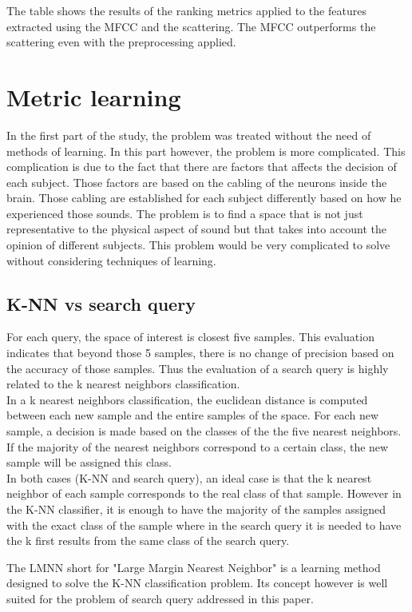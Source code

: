 \documentclass[hidelinks,12pt]{report}
\begin{document}
The table shows the results of the ranking metrics applied to the features extracted using the MFCC and the scattering. The MFCC outperforms the scattering even with the preprocessing applied.

\section{Metric learning}
In the first part of the study, the problem was treated without the need of methods of learning. In this part however, the problem is more complicated. This complication is due to the fact that there are factors that affects the decision of each subject.  Those factors are based on the cabling of the neurons inside the brain. Those cabling are established for each subject differently  based on how he experienced those sounds. The problem is to find a space that is not just representative to the physical aspect of sound but that takes into account the opinion of different subjects. This problem would be very complicated to solve without considering techniques of learning. 
\subsection{K-NN vs search query}
For each query, the space of interest is closest five samples. This evaluation indicates that beyond those 5 samples, there is no change of precision based on the accuracy of those samples. Thus the evaluation of a search query is highly related to the k nearest neighbors classification.\\
In a k nearest neighbors classification, the euclidean distance is computed between each new sample and the entire samples of the space. For each new sample, a decision is made based on the classes of the the five nearest neighbors. If the majority of the nearest neighbors correspond to a certain class, the new sample will be assigned this class.\\
In both cases (K-NN and search query), an ideal case is that the k nearest neighbor of each sample corresponds to the real class of that sample. However in the K-NN classifier, it is enough to have the majority of the samples assigned with the exact class of the sample where in the search query it is needed to have the k first results from the same class of the search query.\par
The LMNN short for "Large Margin Nearest Neighbor" is a learning method designed to solve the K-NN classification problem. Its concept however is well suited for the problem of search query addressed in this paper.
\end{document}
